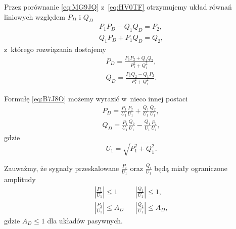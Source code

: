 \documentclass[paper=a4,DIV=12]{tfa}
\begin{document}
Przez porównanie \eqref{eq:MG9JQ} z~\eqref{eq:HV0TF} otrzymujemy układ równań
liniowych względem $P_D$ i $Q_D$
\begin{subequations}
  \begin{align}
    & P_1 P_D - Q_1 Q_D = P_2, &
    \label{eq:CKOLT}
    \\
    & Q_1 P_D + P_1 Q_D = Q_2, &
    \label{eq:5FLMS}
  \end{align}
  \label{eq:85PRD}
\end{subequations}
z~którego rozwiązania dostajemy
\begin{subequations}
  \begin{align}
    & P_D = \frac{P_1 P_2 + Q_1 Q_2}{P_1^2 + Q_1^2}, &
    \label{eq:DJRBO}
    \\
    & Q_D = \frac{P_1 Q_2 - Q_1 P_2}{P_1^2 + Q_1^2}. &
    \label{eq:AR3L3}
  \end{align}
  \label{eq:B7J8O}
\end{subequations}

Formułę \eqref{eq:B7J8O} możemy wyrazić w~nieco innej postaci
\begin{subequations}
  \begin{align}
    & P_D = \frac{P_1}{U_1} \frac{P_2}{U_1}
          + \frac{Q_1}{U_1} \frac{Q_2}{U_1}, &
    \label{eq:NXSH5}
    \\
    & Q_D = \frac{P_1}{U_1} \frac{Q_2}{U_1}
          - \frac{Q_1}{U_1} \frac{P_2}{U_1}, &
    \label{eq:6L48H}
  \end{align}
  \label{eq:F3CUU}
\end{subequations}
gdzie
\begin{equation}
  U_1 = \sqrt{P_1^2 + Q_1^2}.
  \label{eq:W79B6}
\end{equation}

Zauważmy, że sygnały przeskalowane $\frac{P_i}{U_1}$ oraz  $\frac{Q_i}{U_1}$
będą miały ograniczone amplitudy
\begin{subequations}
  \begin{align}
    & \left|\frac{P_1}{U_1}\right| \le 1 &
    & \left|\frac{Q_1}{U_1}\right| \le 1, &
    \label{eq:4AA9D}
    \\
    & \left|\frac{P_2}{U_1}\right| \le A_D &
    & \left|\frac{Q_2}{U_1}\right| \le A_D, &
    \label{eq:TX2NW}
  \end{align}
\end{subequations}
gdzie $A_D \le 1$ dla układów pasywnych.
\end{document}
